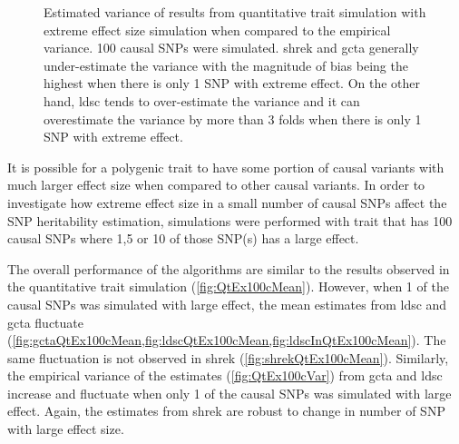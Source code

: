 \begin{figure}
{				
				\label{fig:ldscInQtEx100cVarCom}
			}
			\caption[Estimation of Variance in Extreme Effect Size Simulation]
			{Estimated variance of results from quantitative trait simulation with extreme effect size simulation when compared to the empirical variance.
				100 causal \glspl{SNP} were simulated.
				\gls{shrek} and \gls{gcta} generally under-estimate the variance with the magnitude of bias being the highest when there is only 1 \gls{SNP} with extreme effect.
				On the other hand, \gls{ldsc} tends to over-estimate the variance and it can overestimate the variance by more than 3 folds when there is only 1 \gls{SNP} with extreme effect.
			} 
			\label{fig:QtEx100cVarCom}
		\end{figure}

		It is possible for a polygenic trait to have some portion of causal variants with much larger effect size when compared to other causal variants.
		In order to investigate how extreme effect size in a small number of causal \glspl{SNP} affect the \gls{SNP} heritability estimation, simulations were performed with trait that has 100 causal \glspl{SNP} where 1,5 or 10 of those \gls{SNP}(s) has a large effect.
		
		The overall performance of the algorithms are similar to the results observed in the quantitative trait simulation (\cref{fig:QtEx100cMean}).
		However, when 1 of the causal \glspl{SNP} was simulated with large effect, the mean estimates from \gls{ldsc} and \gls{gcta} fluctuate (\cref{fig:gctaQtEx100cMean,fig:ldscQtEx100cMean,fig:ldscInQtEx100cMean}).
		The same fluctuation is not observed in \gls{shrek} (\cref{fig:shrekQtEx100cMean}). 
		Similarly, the empirical variance of the estimates (\cref{fig:QtEx100cVar}) from \gls{gcta} and \gls{ldsc} increase and fluctuate when only 1 of the causal \glspl{SNP} was simulated with large effect.
		Again, the estimates from \gls{shrek} are robust to change in number of \gls{SNP} with large effect size.
		
